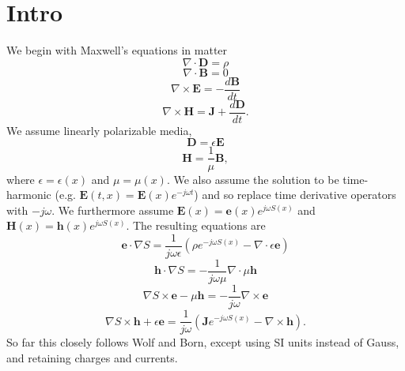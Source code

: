 \documentclass{article}
\newcommand{\Div}[0]{\nabla\cdot}
\newcommand{\Curl}[0]{\nabla\times}
\theoremstyle{plain}
\begin{document}
\section{Intro}\label{sec:intro}

We begin with Maxwell's equations in matter
\begin{equation}
	\Div\mathbf{D} = \rho
\end{equation}
\begin{equation}
	\Div\mathbf{B} = 0
\end{equation}
\begin{equation}
	\Curl\mathbf{E} = -\frac{d\mathbf{B}}{dt}
\end{equation}
\begin{equation}
	\Curl\mathbf{H} = \mathbf{J} + \frac{d\mathbf{D}}{dt}.
\end{equation}
We assume linearly polarizable media,
\begin{equation}
	\mathbf{D} = \epsilon\mathbf{E}
\end{equation}
\begin{equation}
	\mathbf{H} = \frac{1}{\mu}\mathbf{B},
\end{equation}
where $\epsilon=\epsilon(x)$ and $\mu=\mu(x)$. We also assume the solution to be time-harmonic (e.g. $\mathbf{E}(t,x)=\mathbf{E}(x)e^{-j\omega t}$) and so replace time derivative operators with $-j\omega$. We furthermore assume $\mathbf{E}(x) = \mathbf{e}(x)e^{j\omega S(x)}$ and $\mathbf{H}(x) = \mathbf{h}(x)e^{j\omega S(x)}$. The resulting equations are
\begin{equation}\label{eq:max1}
	\mathbf{e}\cdot\nabla S = \frac{1}{j\omega\epsilon}\left( \rho e^{-j\omega S(x)} - \Div\epsilon\mathbf{e} \right)
\end{equation}
\begin{equation}\label{eq:max2}
	\mathbf{h}\cdot\nabla S = -\frac{1}{j\omega\mu}\Div\mu\mathbf{h}
\end{equation}
\begin{equation}\label{eq:max3}
	\nabla S\times\mathbf{e} - \mu\mathbf{h} = -\frac{1}{j\omega}\Curl\mathbf{e}
\end{equation}
\begin{equation}\label{eq:max4}
	\nabla S\times\mathbf{h} + \epsilon\mathbf{e} = \frac{1}{j\omega}\left( \mathbf{J}e^{-j\omega S(x)} - \Curl\mathbf{h} \right).
\end{equation}
So far this closely follows Wolf and Born, except using SI units instead of Gauss, and retaining charges and currents.
\end{document}
